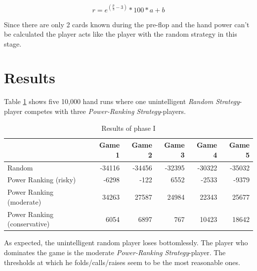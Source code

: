 \begin{equation}
	\label{equ:powerranking}
	r = e^{(\frac{p}{3} - 3)} * 100 * a + b
\end{equation}

Since there are only 2 cards known during the pre-flop and the hand power can't be calculated the player acts like the player with the random strategy in this stage.

\section{Results}
Table \ref{tbl:resultsPhase1} shows five 10,000 hand runs where one unintelligent \emph{Random Strategy}-player competes with three \emph{Power-Ranking Strategy}-players.
\begin{table}[h]
	\centering
	\begin{tabular}[h]{l|r|r|r|r|r}
		& \textbf{Game 1} & \textbf{Game 2} & \textbf{Game 3} & \textbf{Game 4} & \textbf{Game 5}\\
		\hline
		Random & -34116 & -34456 & -32395 & -30322 & -35032\\
		Power Ranking (risky) & -6298 & -122 & 6552 & -2533 & -9379\\
		Power Ranking (moderate) & 34263 & 27587 & 24984 & 22343 & 25677\\
		Power Ranking (conservative) & 6054 & 6897 & 767 & 10423 & 18642\\
	\end{tabular}
	\label{tbl:resultsPhase1}
	\caption{Results of phase I}
\end{table}

As expected, the unintelligent random player loses bottomlessly. The player who dominates the game is the moderate \emph{Power-Ranking Strategy}-player. The thresholds at which he folds/calls/raises seem to be the most reasonable ones.

